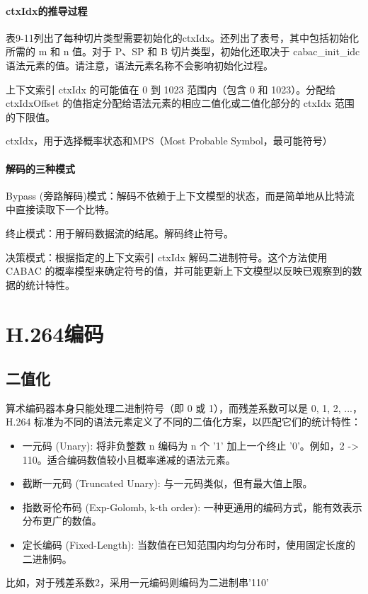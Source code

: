 \documentclass{/Users/hi/Study/template/code}
\begin{document}



\paragraph{ctxIdx的推导过程}
表9-11列出了每种切片类型需要初始化的ctxIdx。还列出了表号，其中包括初始化所需的 m 和 n 值。对于 P、SP 和 B 切片类型，初始化还取决于 cabac\_init\_idc 语法元素的值。请注意，语法元素名称不会影响初始化过程。

上下文索引 ctxIdx 的可能值在 0 到 1023 范围内（包含 0 和 1023）。分配给 ctxIdxOffset 的值指定分配给语法元素的相应二值化或二值化部分的 ctxIdx 范围的下限值。

ctxIdx，用于选择概率状态和MPS（Most Probable Symbol，最可能符号）


\paragraph{解码的三种模式}
Bypass (旁路解码)模式：解码不依赖于上下文模型的状态，而是简单地从比特流中直接读取下一个比特。

终止模式：用于解码数据流的结尾。解码终止符号。

决策模式：根据指定的上下文索引 ctxIdx 解码二进制符号。这个方法使用 CABAC 的概率模型来确定符号的值，并可能更新上下文模型以反映已观察到的数据的统计特性。


\newpage
\section{H.264编码}
\subsection{二值化}
算术编码器本身只能处理二进制符号（即 0 或 1），而残差系数可以是 0, 1, 2, ...，H.264 标准为不同的语法元素定义了不同的二值化方案，以匹配它们的统计特性：
\begin{itemize}
	\item 一元码 (Unary): 将非负整数 n 编码为 n 个 '1' 加上一个终止 '0'。例如，2 -> 110。适合编码数值较小且概率递减的语法元素。
	\item 截断一元码 (Truncated Unary): 与一元码类似，但有最大值上限。
	\item 指数哥伦布码 (Exp-Golomb, k-th order): 一种更通用的编码方式，能有效表示分布更广的数值。
	\item 定长编码 (Fixed-Length): 当数值在已知范围内均匀分布时，使用固定长度的二进制码。
\end{itemize}
\begin{tcolorbox}
	\small
	比如，对于残差系数2，采用一元编码则编码为二进制串'110'
\end{tcolorbox}
\end{document}
